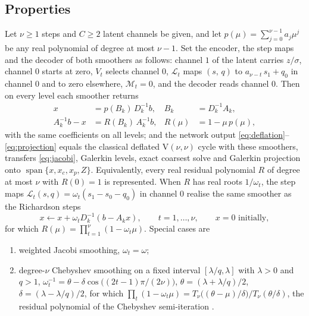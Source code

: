 \subsection{Properties}\label{sec:properties}
\begin{proposition}\label{prop:containment}
Let $\nu\ge1$ steps and $C\ge2$ latent channels be given, and let $p(\mu) = \sum_{j=0}^{\nu-1}a_j\mu^j$ be any real
polynomial of degree at most $\nu-1$. Set the encoder, the step maps and the decoder of both smoothers as follows: channel $1$
of the latent carries $z/\sigma$, channel $0$ starts at zero, $V_t$ selects channel $0$, $\mathcal{L}_t$ maps $(s,\,q)$ to
$a_{\nu-t}\,s_1 + q_0$ in channel $0$ and to zero elsewhere, $\mathcal{M}_t = 0$, and the decoder reads channel $0$. Then on
every level each smoother returns
\begin{equation}\label{eq:polysmoother}
\begin{aligned}
  x &= p(B_k)\,D_k^{-1}b, & B_k &= D_k^{-1}A_k,\\
  A_k^{-1}b - x &= R(B_k)\,A_k^{-1}b, & R(\mu) &= 1 - \mu\,p(\mu),
\end{aligned}
\end{equation}
with the same coefficients on all levels; and the network output \eqref{eq:deflation}--\eqref{eq:projection} equals the
classical deflated V$(\nu,\nu)$ cycle with these smoothers, transfers \eqref{eq:jacobi}, Galerkin levels, exact coarsest solve
and Galerkin projection onto $\operatorname{span}\{x,x_c,x_p,Z\}$. Equivalently, every real residual polynomial $R$ of degree at
most $\nu$ with $R(0) = 1$ is represented. When $R$ has real roots $1/\omega_t$, the step maps
$\mathcal{L}_t(s,q) = \omega_t(s_1 - s_0 - q_0)$ in channel $0$ realise the same smoother as the Richardson steps
\begin{equation}\label{eq:richardson}
  x \leftarrow x + \omega_t D_k^{-1}(b - A_k x), \qquad t = 1,\dots,\nu, \qquad x = 0 \text{ initially},
\end{equation}
for which $R(\mu) = \prod_{t=1}^{\nu}(1 - \omega_t\mu)$. Special cases are
\begin{enumerate}
\item[(a)] weighted Jacobi smoothing, $\omega_t = \omega$;
\item[(b)] degree-$\nu$ Chebyshev smoothing on a fixed interval $[\lambda/q,\lambda]$ with $\lambda>0$ and $q>1$,
$\omega_t^{-1} = \theta - \delta\cos\big((2t-1)\pi/(2\nu)\big)$, $\theta = (\lambda + \lambda/q)/2$, $\delta = (\lambda - \lambda/q)/2$,
for which $\prod_t(1-\omega_t\mu) = T_\nu\big((\theta-\mu)/\delta\big)/T_\nu(\theta/\delta)$, the residual polynomial of the
Chebyshev semi-iteration \cite{saad2003}.
\end{enumerate}
\end{proposition}
